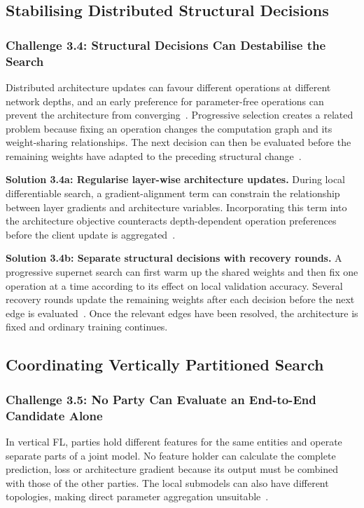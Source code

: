 \subsection{Stabilising Distributed Structural Decisions}

\subsubsection{Challenge 3.4: Structural Decisions Can Destabilise the Search}

Distributed architecture updates can favour different operations at different network depths, and an early preference for parameter-free operations can prevent the architecture from converging~\cite{remote_sensing_fednas_2025}. Progressive selection creates a related problem because fixing an operation changes the computation graph and its weight-sharing relationships. The next decision can then be evaluated before the remaining weights have adapted to the preceding structural change~\cite{spider_2021}.

\noindent\textbf{Solution 3.4a: Regularise layer-wise architecture updates.} During local differentiable search, a gradient-alignment term can constrain the relationship between layer gradients and architecture variables. Incorporating this term into the architecture objective counteracts depth-dependent operation preferences before the client update is aggregated~\cite{remote_sensing_fednas_2025}.

\noindent\textbf{Solution 3.4b: Separate structural decisions with recovery rounds.} A progressive supernet search can first warm up the shared weights and then fix one operation at a time according to its effect on local validation accuracy. Several recovery rounds update the remaining weights after each decision before the next edge is evaluated~\cite{spider_2021}. Once the relevant edges have been resolved, the architecture is fixed and ordinary training continues.

\subsection{Coordinating Vertically Partitioned Search}

\subsubsection{Challenge 3.5: No Party Can Evaluate an End-to-End Candidate Alone}

In vertical FL, parties hold different features for the same entities and operate separate parts of a joint model. No feature holder can calculate the complete prediction, loss or architecture gradient because its output must be combined with those of the other parties. The local submodels can also have different topologies, making direct parameter aggregation unsuitable~\cite{self-supervised_vertical_fednas_2023}.

